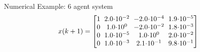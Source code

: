 \documentclass[10pt]{beamer}
\begin{document}
\begin{frame}{Numerical Example: 6 agent system}
  \vspace{-1pt}
  {\footnotesize
    \begin{align*}
      x(k+1)=\begin{bmatrix}
	1  \hspace{-2pt}&\hspace{-2pt}   2.0\hspace{-2pt}\cdot\hspace{-2pt} 10^{-2}  \hspace{-2pt}&\hspace{-2pt}  -2.0\hspace{-2pt}\cdot\hspace{-2pt} 10^{-4}  \hspace{-2pt}&\hspace{-2pt}  1.9\hspace{-2pt}\cdot\hspace{-2pt} 10^{-5}\\
	0  \hspace{-2pt}&\hspace{-2pt}   1.0\hspace{-2pt}\cdot\hspace{-2pt} 10^{0}   \hspace{-2pt}&\hspace{-2pt} -2.0\hspace{-2pt}\cdot\hspace{-2pt} 10^{-2}  \hspace{-2pt}&\hspace{-2pt}   1.8\hspace{-2pt}\cdot\hspace{-2pt} 10^{-3}\\
	0  \hspace{-2pt}&\hspace{-2pt}   1.0\hspace{-2pt}\cdot\hspace{-2pt} 10^{-5} \hspace{-2pt}&\hspace{-2pt}   1.0\hspace{-2pt}\cdot\hspace{-2pt} 10^{0} \hspace{-2pt}&\hspace{-2pt}   2.0\hspace{-2pt}\cdot\hspace{-2pt} 10^{-2}\\
	0  \hspace{-2pt}&\hspace{-2pt}   1.0\hspace{-2pt}\cdot\hspace{-2pt} 10^{-3}\hspace{-2pt}&\hspace{-2pt}  2.1\hspace{-2pt}\cdot\hspace{-2pt} 10^{-1}  \hspace{-2pt}&\hspace{-2pt}  9.8\hspace{-2pt}\cdot\hspace{-2pt} 10^{-1}

\end{bmatrix}
\end{align*}}
\end{frame}
\end{document}
